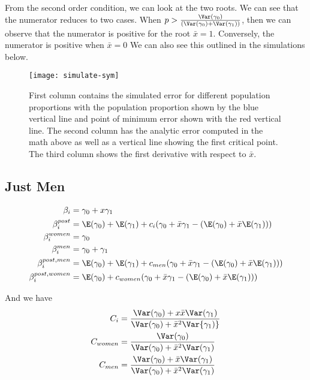 From the second order condition, we can look at the two roots. We can see that the numerator reduces to two cases. When $p > \frac{\Var(\gamma_0)}{(\Var(\gamma_0) + \Var(\gamma_1))}$, then we can observe that the numerator is positive for the root $\bar{x} = 1$. Conversely, the numerator is positive when  $\bar{x} = 0$
We can also see this outlined in the simulations below.
\begin{figure}[ht!]
	\label{fig:simulate-sym}
  \centering
	\texttt{[image: simulate-sym]}
	\caption{First column contains the simulated error for different population proportions with the population proportion shown by the blue vertical line and point of minimum error shown with the red vertical line. The second column has the analytic error computed in the math above as well as a vertical line showing the first critical point. The third column shows the first derivative with respect to $\bar{x}$.} 
\end{figure}





\subsection*{Just Men}

\begin{align*}
	\beta_i &= \gamma_0 + x \gamma_1 \\
	\beta_{i}^{post} &= \E(\gamma_0) + \E(\gamma_1)  + c_i ( \gamma_0 + \bar{x} \gamma_1 - (\E(\gamma_0) + \bar{x} \E(\gamma_1))) \\
	\beta_i^{women} &= \gamma_0 \\
	\beta_i^{men} &= \gamma_0 + \gamma_1 \\
	\beta_i^{post,men} &= \E(\gamma_0) + \E(\gamma_1)  + c_{men} ( \gamma_0 + \bar{x} \gamma_1 - (\E(\gamma_0) + \bar{x} \E(\gamma_1))) \\
	\beta_i^{post, women} &= \E(\gamma_0) +  c_{women} ( \gamma_0 + \bar{x} \gamma_1 - (\E(\gamma_0) + \bar{x} \E(\gamma_1))) \\
\end{align*} 

And we have
\begin{align*}
	C_i &= \frac{\Var(\gamma_0) + x \bar{x} \Var(\gamma_1)}{\Var(\gamma_0) + \bar{x}^2 \Var{\gamma_1)}} \\
	C_{women} &= \frac{\Var(\gamma_0)}{\Var(\gamma_0) + \bar{x}^2 \Var(\gamma_1)} \\
	C_{men} &= \frac{\Var(\gamma_0) + \bar{x} \Var(\gamma_1)}{\Var(\gamma_0) + \bar{x}^2 \Var(\gamma_1)}
\end{align*} 

